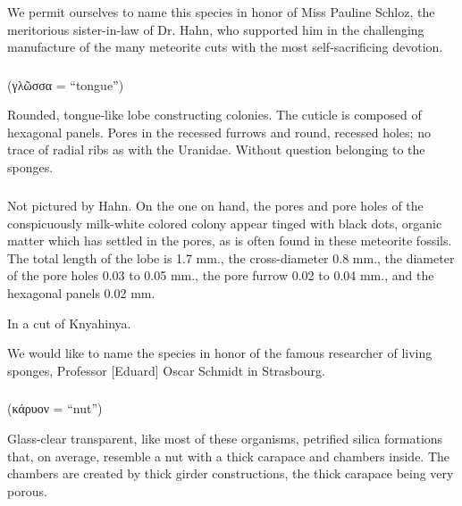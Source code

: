 \documentclass[a4paper, 12pt, oneside]{article}
\begin{document}
We permit ourselves to name this species in honor of Miss Pauline Schloz, the meritorious sister-in-law of Dr. Hahn, who supported him in the challenging manufacture of the many meteorite cuts with the most self-sacrificing devotion.

\subsubsection{}
\paragraph*{}
(γλῶσσα = ``tongue'')%

Rounded, tongue-like lobe constructing colonies. The cuticle is composed of hexagonal panels. Pores in the recessed furrows and round, recessed holes; no trace of radial ribs as with the Uranidae. Without question belonging to the sponges.
\paragraph{\large{}}
\subparagraph{}
Not pictured by Hahn. On the one on hand, the pores and pore holes of the conspicuously milk-white colored colony appear tinged with black dots, organic matter which has settled in the pores, as is often found in these meteorite fossils. The total length of the lobe is 1.7 mm., the cross-diameter 0.8 mm., the diameter of the pore holes 0.03 to 0.05 mm., the pore furrow 0.02 to 0.04 mm., and the hexagonal panels 0.02 mm.

In a cut of Knyahinya.

We would like to name the species in honor of the famous researcher of living sponges, Professor [Eduard] Oscar Schmidt in Strasbourg.
\subsubsection{}
\paragraph*{}
(κάρυον = ``nut'')%

Glass-clear transparent, like most of these organisms, petrified silica formations that, on average, resemble a nut with a thick carapace and chambers inside. The chambers are created by thick girder constructions, the thick carapace being very porous.
\end{document}
